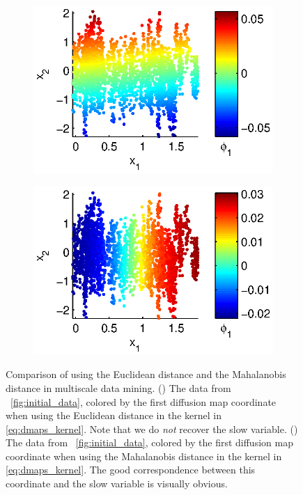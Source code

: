 \begin{figure}[t]
\centering
\begin{subfigure}{0.45\textwidth}
\centering
\includegraphics[width=\textwidth]{data_linear_DMAPS}
\caption{}
\label{subfig:NIV_versus_DMAPS1}
\end{subfigure}
\begin{subfigure}{0.45\textwidth}
\centering
\includegraphics[width=\textwidth]{data_linear_NIV}
\caption{}
\label{subfig:NIV_versus_DMAPS2}
\end{subfigure}
%
\caption[Comparison of using the Euclidean distance and the Mahalanobis distance in multiscale data mining]{Comparison of using the Euclidean distance and the Mahalanobis distance in multiscale data mining. () The data from \fig~\ref{fig:initial_data}, colored by the first diffusion map coordinate when using the Euclidean distance in the kernel in \eqref{eq:dmaps_kernel}. Note that we do {\em not} recover the slow variable. () The data from \fig~\ref{fig:initial_data}, colored by the first diffusion map coordinate when using the Mahalanobis distance in the kernel in \eqref{eq:dmaps_kernel}. The good correspondence between this coordinate and the slow variable is visually obvious.}
\label{fig:NIV_versus_DMAPS}
\end{figure}

